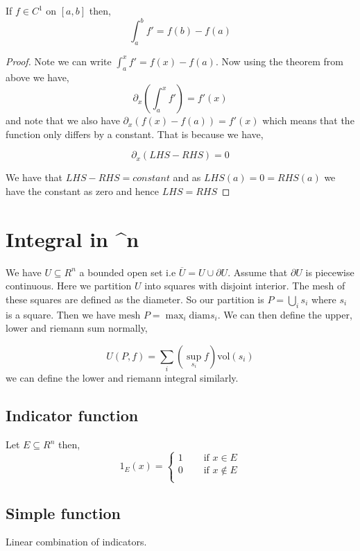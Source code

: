 \begin{theorem}
    If $f \in C^{1}$ on $[a, b]$ then, 
    \[
        \int_{a}^{b} f' = f(b) - f(a)
    \]
\end{theorem}
\begin{proof}
    Note we can write $\int_{a}^{x} f' = f(x) - f(a)$. Now using the theorem from above we have, 
    \[
        \partial_x \left ( \int_{a}^{x} f'\right ) = f'(x)
    \]
    and note that we also have $\partial_x(f(x) - f(a)) = f'(x)$ which means that the function only differs by a constant. That is because we have, 
    
    \[
        \partial_x(LHS - RHS) = 0
    \]

    We have that $LHS - RHS = constant$ and as $LHS(a) = 0 = RHS(a)$ we have the constant as zero and hence $LHS = RHS$
\end{proof}



\section{Integral in \R^{n}}
We have $U \subseteq R^{n}$ a bounded open set i.e $\overline{U} = U \cup \partial U$. Assume that $\partial U$ is piecewise continuous. Here we partition $U$ into squares with disjoint interior. The mesh of these squares are defined as the diameter. So our partition is $P = \bigcup_i s_i$ where $s_i$ is a square. Then we have $\text{mesh } P = \max_i \text{diam} s_i$. We can then define the upper, lower and riemann sum normally,


\[
  U(P, f) = \sum_{i}^{} \left ( \sup_{s_i} f\right )  \text{vol}(s_i)
\]
we can define the lower and riemann integral similarly.

\vspace{1em}

\subsection{Indicator function}
Let $E \subseteq R^{n}$ then, 
\[
  1_{E}(x) = \begin{cases}
    1 \quad &\text{ if } x \in E\\
    0 \quad &\text{ if } x \not \in E\\
  \end{cases}
\]
\subsection{Simple function}
Linear combination of indicators. 

